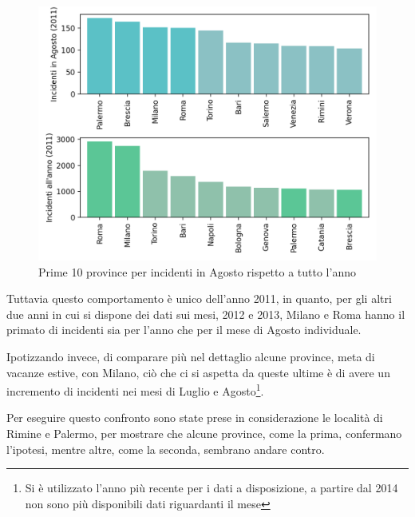 \documentclass[a4paper]{report}
\begin{document}
\begin{figure}
    \includegraphics[width=\linewidth]{../src/incidenti/incidenti_senza_coords/mese_incidenti/mesi_estivi.png}
    \caption{Prime 10 province per incidenti in Agosto rispetto a tutto l'anno}
    \label{fig:mesi-estivi}
\end{figure}

Tuttavia questo comportamento è unico dell'anno 2011, in quanto, per gli altri due anni in cui 
si dispone dei dati sui mesi, 2012 e 2013, Milano e Roma hanno il primato di 
incidenti sia per l'anno che per il mese di Agosto individuale.

Ipotizzando invece, di comparare più nel dettaglio alcune province, meta di vacanze estive, 
con Milano, ciò che ci si aspetta da queste ultime è di avere un incremento di incidenti nei mesi 
di Luglio e Agosto\footnote{Si è utilizzato l'anno più recente per i dati a disposizione, 
a partire dal 2014 non sono più disponibili dati riguardanti il mese}.

Per eseguire questo confronto sono state prese in considerazione le località di Rimine e Palermo, 
per mostrare che alcune province, come la prima, confermano l'ipotesi, mentre altre, come la seconda, 
sembrano andare contro.
\end{document}
